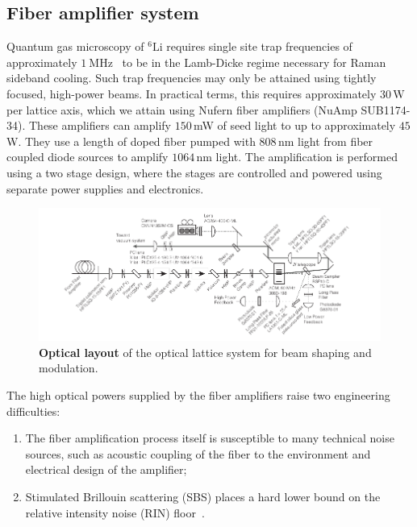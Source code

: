 \documentclass[twocolumn,aps,pra,showpacs,preprintnumbers,bibnotes]{revtex4-1}
\newcommand\unit[2]{\ensuremath{#1~\mathrm{{#2}}}}
\newcommand\Isotope[2]{\ensuremath{^{#1}\mathrm{#2}}}
\newcommand\Li{\Isotope{6}{Li}}
\begin{document}
\subsection{Fiber amplifier system}
Quantum gas microscopy of \Li{} requires single site trap frequencies of approximately \unit{1}{MHz}~\cite{Parsons2015} to be in the Lamb-Dicke regime necessary for Raman sideband cooling.
Such trap frequencies may only be attained using tightly focused, high-power beams.
In practical terms, this requires approximately $30\,$W per lattice axis, which we attain using Nufern fiber amplifiers (NuAmp SUB1174-34).
These amplifiers can amplify $150\,$mW of seed light to up to approximately $45\,$W. They use a length of doped fiber pumped with $808\,$nm light from fiber coupled diode sources to amplify $1064\,$nm light.
The amplification is performed using a two stage design, where the stages are controlled and powered using separate power supplies and electronics.

\begin{figure}[t]
  \begin{center}
    \includegraphics{Figure3.pdf}
    \caption{\textbf{Optical layout} of the optical lattice system for beam shaping and modulation.}
    \label{fig:optical_layout}
  \end{center}
\end{figure}

The high optical powers supplied by the fiber amplifiers raise two engineering difficulties:
\begin{enumerate}
  \item The fiber amplification process itself is susceptible to many technical noise sources, such as acoustic coupling of the fiber to the environment and electrical design of the amplifier;
  \item Stimulated Brillouin scattering (SBS) places a hard lower bound on the relative intensity noise (RIN) floor~\cite{Agrawal2013}.
\end{enumerate}
\end{document}
